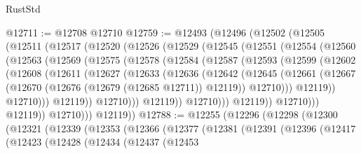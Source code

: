 \begin{lexlean}{RustStd}
\begin{coremodule}
@12711 := @12708 @12710
@12759 := @12493
    (@12496
      (@12502
        (@12505
          (@12511
            (@12517
              (@12520
                (@12526
                  (@12529
                    (@12545
                      (@12551
                        (@12554
                          (@12560
                            (@12563
                              (@12569
                                (@12575
                                  (@12578
                                    (@12584
                                      (@12587
                                        (@12593
                                          (@12599
                                            (@12602
                                              (@12608
                                                (@12611
                                                  (@12627
                                                    (@12633
                                                      (@12636
                                                        (@12642
                                                          (@12645
                                                            (@12661
                                                              (@12667
                                                                (@12670
                                                                  (@12676
                                                                    (@12679 (@12685 @12711))
                                                                    @12119))
                                                                @12710)))
                                                          @12119))
                                                      @12710)))
                                                @12119))
                                            @12710)))
                                      @12119))
                                  @12710)))
                            @12119))
                        @12710)))
                  @12119))
              @12710)))
        @12119))
@12788 := @12255
    (@12296
      (@12298
        (@12300
          (@12321
            (@12339
              (@12353
                (@12366
                  (@12377
                    (@12381
                      (@12391
                        (@12396
                          (@12417
                            (@12423
                              (@12428
                                (@12434
                                  (@12437
                                    (@12453

\end{coremodule}
\end{lexlean}
